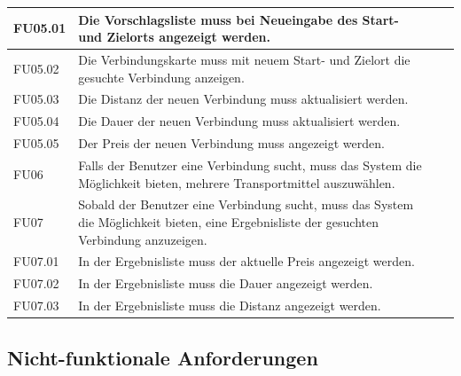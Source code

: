 \documentclass[a4paper, 11pt]{scrreprt}
\begin{document}
\begin{table}[H]
\begin{tabular}{|p{2.5cm} p{12cm}| ll}
\hline
FU05.01	&Die Vorschlagsliste muss bei Neueingabe des Start- und Zielorts angezeigt werden.\\

\hline
FU05.02	&Die Verbindungskarte muss mit neuem Start- und Zielort die gesuchte Verbindung anzeigen.\\

\hline
FU05.03	&Die Distanz der neuen Verbindung muss aktualisiert werden.\\

\hline
FU05.04&	Die Dauer der neuen Verbindung muss aktualisiert werden.\\

\hline
FU05.05	&Der Preis der neuen Verbindung muss angezeigt werden.\\

\hline
FU06	&Falls der Benutzer eine Verbindung sucht, muss das System die Möglichkeit bieten, mehrere Transportmittel auszuwählen.\\

\hline
FU07	&Sobald der Benutzer eine Verbindung sucht, muss das System die Möglichkeit bieten, eine Ergebnisliste der gesuchten Verbindung anzuzeigen.\\

\hline
FU07.01&	In der Ergebnisliste muss der aktuelle Preis angezeigt werden.\\

\hline
FU07.02 &	In der Ergebnisliste muss die Dauer angezeigt werden.\\

\hline
FU07.03&	In der Ergebnisliste muss die Distanz angezeigt werden.\\

\hline


\end{tabular}

\end{table}

\subsection{Nicht-funktionale Anforderungen}
\end{document}
